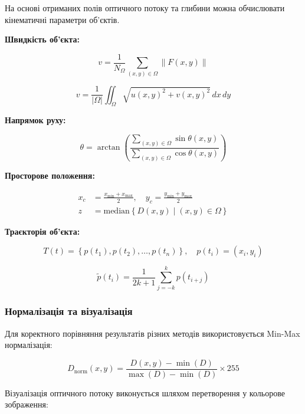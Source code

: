 \documentclass[14pt, a4paper]{extarticle}
\numberwithin{equation}{section}
\begin{document}
На основі отриманих полів оптичного потоку та глибини можна обчислювати кінематичні параметри об'єктів.

\textbf{Швидкість об'єкта:}

\begin{equation}
v = \frac{1}{N_\Omega} \sum_{(x,y) \in \Omega} \|F(x,y)\| \tag{41}
\end{equation}

\begin{equation}
v = \frac{1}{|\Omega|} \iint_{\Omega} \sqrt{u(x,y)^2 + v(x,y)^2} \, dx\,dy \tag{42}
\end{equation}

\textbf{Напрямок руху:}

\begin{equation}
\theta = \arctan\left( \frac{\sum_{(x,y) \in \Omega} \sin\theta(x,y)}{\sum_{(x,y) \in \Omega} \cos\theta(x,y)} \right) \tag{44}
\end{equation}

\textbf{Просторове положення:}

\begin{align}
x_c &= \frac{x_{\min} + x_{\max}}{2}, \quad y_c = \frac{y_{\min} + y_{\max}}{2} \tag{46-47} \\
z &= \text{median}\left\{ D(x,y) \mid (x,y) \in \Omega \right\} \tag{48}
\end{align}

\textbf{Траєкторія об'єкта:}

\begin{equation}
T(t) = \left\{ p(t_1), p(t_2), \ldots, p(t_n) \right\}, \quad p(t_i) = (x_i, y_i) \tag{50}
\end{equation}

\begin{equation}
\tilde{p}(t_i) = \frac{1}{2k+1} \sum_{j=-k}^{k} p(t_{i+j}) \tag{51}
\end{equation}

\subsubsection{Нормалізація та візуалізація}

Для коректного порівняння результатів різних методів використовується Min-Max нормалізація:

\begin{equation}
D_{\text{norm}}(x,y) = \frac{D(x,y) - \min(D)}{\max(D) - \min(D)} \times 255 \tag{75}
\end{equation}

Візуалізація оптичного потоку виконується шляхом перетворення у кольорове зображення:
\end{document}
